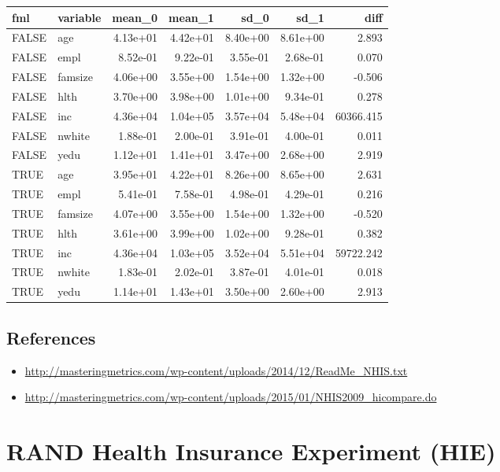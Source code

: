 \documentclass[]{book}
\providecommand{\tightlist}{%
  \setlength{\itemsep}{0pt}\setlength{\parskip}{0pt}}
\theoremstyle{definition}
\theoremstyle{definition}
\theoremstyle{definition}
\theoremstyle{remark}
\begin{document}
\begin{tabular}{l|l|r|r|r|r|r}
\hline
fml & variable & mean\_0 & mean\_1 & sd\_0 & sd\_1 & diff\\
\hline
FALSE & age & 4.13e+01 & 4.42e+01 & 8.40e+00 & 8.61e+00 & 2.893\\
\hline
FALSE & empl & 8.52e-01 & 9.22e-01 & 3.55e-01 & 2.68e-01 & 0.070\\
\hline
FALSE & famsize & 4.06e+00 & 3.55e+00 & 1.54e+00 & 1.32e+00 & -0.506\\
\hline
FALSE & hlth & 3.70e+00 & 3.98e+00 & 1.01e+00 & 9.34e-01 & 0.278\\
\hline
FALSE & inc & 4.36e+04 & 1.04e+05 & 3.57e+04 & 5.48e+04 & 60366.415\\
\hline
FALSE & nwhite & 1.88e-01 & 2.00e-01 & 3.91e-01 & 4.00e-01 & 0.011\\
\hline
FALSE & yedu & 1.12e+01 & 1.41e+01 & 3.47e+00 & 2.68e+00 & 2.919\\
\hline
TRUE & age & 3.95e+01 & 4.22e+01 & 8.26e+00 & 8.65e+00 & 2.631\\
\hline
TRUE & empl & 5.41e-01 & 7.58e-01 & 4.98e-01 & 4.29e-01 & 0.216\\
\hline
TRUE & famsize & 4.07e+00 & 3.55e+00 & 1.54e+00 & 1.32e+00 & -0.520\\
\hline
TRUE & hlth & 3.61e+00 & 3.99e+00 & 1.02e+00 & 9.28e-01 & 0.382\\
\hline
TRUE & inc & 4.36e+04 & 1.03e+05 & 3.52e+04 & 5.51e+04 & 59722.242\\
\hline
TRUE & nwhite & 1.83e-01 & 2.02e-01 & 3.87e-01 & 4.01e-01 & 0.018\\
\hline
TRUE & yedu & 1.14e+01 & 1.43e+01 & 3.50e+00 & 2.60e+00 & 2.913\\
\hline
\end{tabular}

\section{References}\label{references}

\begin{itemize}
\tightlist
\item
  \url{http://masteringmetrics.com/wp-content/uploads/2014/12/ReadMe_NHIS.txt}
\item
  \url{http://masteringmetrics.com/wp-content/uploads/2015/01/NHIS2009_hicompare.do}
\end{itemize}

\chapter{RAND Health Insurance Experiment
(HIE)}\label{rand-health-insurance-experiment-hie}
\end{document}
